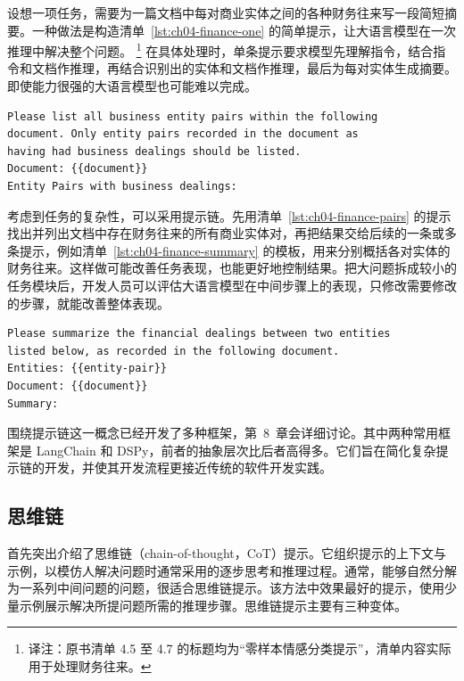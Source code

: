 设想一项任务，需要为一篇文档中每对商业实体之间的各种财务往来写一段简短摘要。一种做法是构造清单~\ref{lst:ch04-finance-one} 的简单提示，让大语言模型在一次推理中解决整个问题。%
\footnote{译注：原书清单 4.5 至 4.7 的标题均为“零样本情感分类提示”，清单内容实际用于处理财务往来。}
在具体处理时，单条提示要求模型先理解指令，结合指令和文档作推理，再结合识别出的实体和文档作推理，最后为每对实体生成摘要。即使能力很强的大语言模型也可能难以完成。

\noindent\begin{minipage}{\linewidth}
\begin{lstlisting}[caption={零样本情感分类提示},label={lst:ch04-finance-pairs}]
Please list all business entity pairs within the following
document. Only entity pairs recorded in the document as
having had business dealings should be listed.
Document: {{document}}
Entity Pairs with business dealings:
\end{lstlisting}
\end{minipage}\par

考虑到任务的复杂性，可以采用提示链。先用清单~\ref{lst:ch04-finance-pairs} 的提示找出并列出文档中存在财务往来的所有商业实体对，再把结果交给后续的一条或多条提示，例如清单~\ref{lst:ch04-finance-summary} 的模板，用来分别概括各对实体的财务往来。这样做可能改善任务表现，也能更好地控制结果。把大问题拆成较小的任务模块后，开发人员可以评估大语言模型在中间步骤上的表现，只修改需要修改的步骤，就能改善整体表现。

\noindent\begin{minipage}{\linewidth}
\begin{lstlisting}[caption={零样本情感分类提示},label={lst:ch04-finance-summary}]
Please summarize the financial dealings between two entities
listed below, as recorded in the following document.
Entities: {{entity-pair}}
Document: {{document}}
Summary:
\end{lstlisting}
\end{minipage}\par

围绕提示链这一概念已经开发了多种框架，第~8~章会详细讨论。其中两种常用框架是 LangChain 和 DSPy，前者的抽象层次比后者高得多。它们旨在简化复杂提示链的开发，并使其开发流程更接近传统的软件开发实践。

\subsection{思维链}
\label{sec:ch04-cot}
首先突出介绍了思维链（chain-of-thought，CoT）提示。它组织提示的上下文与示例，以模仿人解决问题时通常采用的逐步思考和推理过程。通常，能够自然分解为一系列中间问题的问题，很适合思维链提示。该方法中效果最好的提示，使用少量示例展示解决所提问题所需的推理步骤。思维链提示主要有三种变体。

